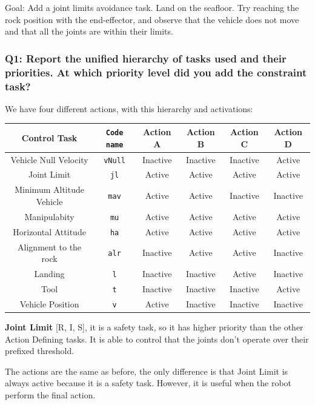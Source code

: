 \documentclass{article}
\newcommand{\ocio} {\marginpar{!}}
\begin{document}
Goal: Add a joint limits avoidance task. Land on the seafloor. Try reaching the rock position with the end-effector, and observe that the vehicle does not move and that all the joints are within their limits.

\subsubsection{Q1: Report the unified hierarchy of tasks used and their priorities. At which priority level did you add the constraint task?}
We have four different actions, with this hierarchy and activations:
\begin{center}
\begin{tabular}{ | c | c | c | c | c | c |}
\hline
 Control Task & \texttt{Code name} & Action A & Action B & Action C & Action D\\
 \hline
 Vehicle Null Velocity & \texttt{vNull} & Inactive & Inactive & Inactive & Active\\
 Joint Limit & \texttt{jl} & Active & Active & Active & Active \\
 Minimum Altitude Vehicle &  \texttt{mav} & Active & Active & Inactive & Inactive \\  
 Manipulabity &  \texttt{mu} & Active & Active & Active & Active  \\
 Horizontal Attitude &  \texttt{ha} & Active & Active & Active & Active\\
 Alignment to the rock & \texttt{alr} & Inactive & Active & Active & Inactive \\
 Landing & \texttt{l} &Inactive & Inactive & Active & Inactive\\
 Tool  &  \texttt{t} & Inactive & Inactive & Inactive & Active\\
 Vehicle Position &  \texttt{v} &Active & Inactive & Inactive & Inactive\\
 \hline
\end{tabular}
\end{center}

\begin{description}
\item \textbf{Joint Limit} [R, I, S], it is a safety task, so it has higher priority than the other Action Defining tasks. It is able to control that the joints don't operate over their prefixed threshold. \ocio
\end{description}

The actions are the same as before, the only difference is that Joint Limit is always active because it is a safety task. However, it is useful when the robot perform the final action. 
\end{document}
